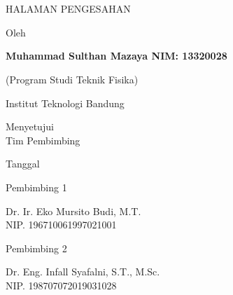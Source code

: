 \clearpage
\chapter*{} %

\begin{center}
	\begin{singlespace}
		\large \bfseries \MakeUppercase{\thetitle}
		
		\large \MakeUppercase{Halaman Pengesahan}
		
		\vspace{15mm}
		
		\normalsize \normalfont 
		Oleh
		
		\bfseries
		Muhammad Sulthan Mazaya \hspace{5mm} NIM: 13320028
		
		(Program Studi Teknik Fisika) \\
		
		\vspace{10mm}
		
		\normalsize \normalfont 
		Institut Teknologi Bandung \\
		
		\vspace{20mm}
		
		Menyetujui\\
		Tim Pembimbing
		
		\vspace{10mm}
		
		Tanggal \tanggalpengesahan
		
		\vspace{0.5cm}
		
		\begin{multicols}{2}
			Pembimbing 1
			
			\vspace{25mm}
			
			Dr. Ir. Eko Mursito Budi, M.T.\\
			NIP. 196710061997021001
			
			\columnbreak
			
			
			Pembimbing 2
			
			\vspace{25mm}
			
			Dr. Eng. Infall Syafalni, S.T., M.Sc.\\
			NIP. 198707072019031028
		\end{multicols}
	\end{singlespace}
\end{center}
\clearpage
